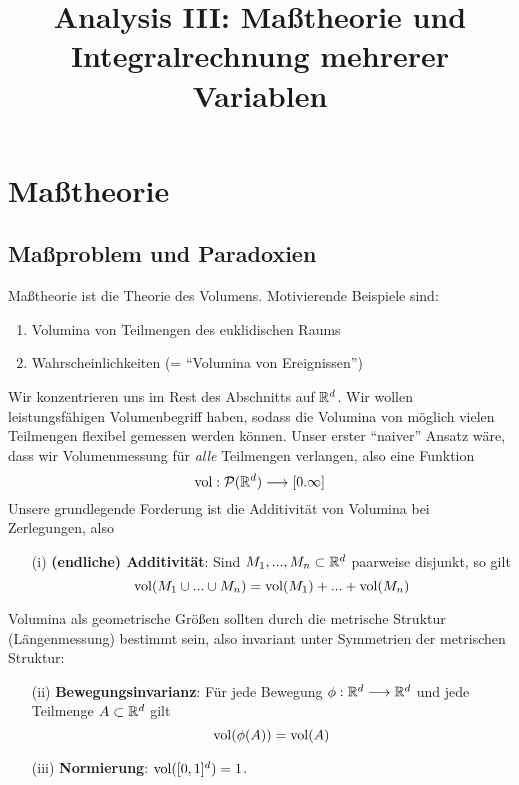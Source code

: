 
\title{Analysis III: Maßtheorie und Integralrechnung mehrerer Variablen}

\maketitle
\tableofcontents
{}
\newpage
\setcounter{page}{2}
\section{Maßtheorie}
\subsection{Maßproblem und Paradoxien}
Maßtheorie ist die Theorie des Volumens. Motivierende Beispiele sind:
\begin{enumerate}[label=\roman*),topsep=3pt, itemsep=0pt]
\item Volumina von Teilmengen des euklidischen Raums
\item Wahrscheinlichkeiten (= ``Volumina von Ereignissen'')
\end{enumerate}
Wir konzentrieren uns im Rest des Abschnitts auf $\mathbb{R}^d$. Wir wollen leistungsfähigen Volumenbegriff haben, sodass die Volumina von möglich vielen Teilmengen flexibel gemessen werden können. Unser erster ``naiver'' Ansatz wäre, dass wir Volumenmessung für \emph{alle} Teilmengen verlangen, also eine Funktion
\begin{equation*}
 \operatorname{vol}: \mathcal{P}(\mathbb{R}^d) \longrightarrow [0.\infty]
\end{equation*}
Unsere grundlegende Forderung ist die Additivität von Volumina bei Zerlegungen, also
\begin{enumerate}
\item[(i)] \textbf{(endliche) Additivität}: Sind $M_1,...,M_n\subset \mathbb{R}^d$ paarweise disjunkt, so gilt
\begin{equation*}
\operatorname{vol} (M_1\cup ... \cup M_n) = \operatorname{vol}(M_1)+...+\operatorname{vol} (M_n)
\end{equation*}
\end{enumerate}
Volumina als geometrische Größen sollten durch die metrische Struktur (Längenmessung) bestimmt sein, also invariant unter Symmetrien der metrischen Struktur:
\begin{enumerate}
\item[(ii)] \textbf{Bewegungsinvarianz}: Für jede Bewegung $\phi: \mathbb{R}^d \longrightarrow \mathbb{R}^d$ und jede Teilmenge $A\subset \mathbb{R}^d$ gilt
\begin{equation*}
\operatorname{vol}(\phi(A)) = \operatorname{vol} (A)
\end{equation*}
\item[(iii)] \textbf{Normierung}: $\operatorname{vol}([0,1]^d)=1$.
\end{enumerate}
